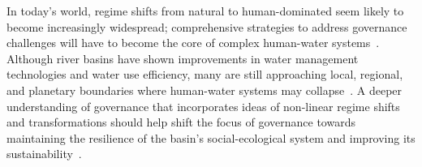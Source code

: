 In today's world, regime shifts from natural to human-dominated seem likely to become increasingly widespread; comprehensive strategies to address governance challenges will have to become the core of complex human-water systems~\cite{cumming2018,cumming2014,jaeger2019}.
Although river basins have shown improvements in water management technologies and water use efficiency, many are still approaching local, regional, and planetary boundaries where human-water systems may collapse~\cite{gleeson2020, wang-erlandsson2022}.
A deeper understanding of governance that incorporates ideas of non-linear regime shifts and transformations should help shift the focus of governance towards maintaining the resilience of the basin’s social-ecological system and improving its sustainability~\cite{falkenmark2019}.
